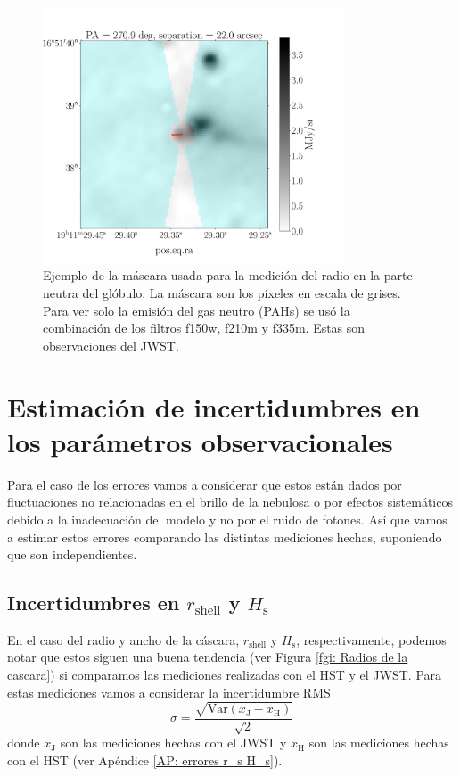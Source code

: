 \documentclass{book}
\begin{document}
\begin{figure}[htb]
    \centering
    \includegraphics[width=0.8\textwidth]{Nuevas imagenes finales/r_0_.pdf}
    \caption{Ejemplo de la máscara usada para la medición del radio en la parte neutra del glóbulo. La máscara son los píxeles en escala de grises. Para ver solo la emisión del gas neutro (PAHs) se usó la combinación de los filtros f150w, f210m y f335m. Estas son observaciones del JWST.}
    \label{Medicion de r_0}
\end{figure}

\section[Errores observacionales]{Estimación de incertidumbres en los parámetros observacionales}

Para el caso de los errores vamos a considerar que estos están dados por fluctuaciones no relacionadas en el brillo de la nebulosa o por efectos  sistemáticos debido a la inadecuación del modelo y no por el ruido de fotones. Así que vamos a estimar estos errores comparando las distintas mediciones hechas, suponiendo que son independientes.

\subsection{\boldmath Incertidumbres en $r_\mathrm{shell}$ y $H_\mathrm{s}$}
\label{sec:error-shell}
En el caso del radio y ancho de la cáscara, $r_\mathrm{shell}$ y $H_\mathrm{s}$, respectivamente, podemos notar que estos siguen una buena tendencia (ver Figura \ref{fgi: Radios de la cascara}) si comparamos las mediciones realizadas con el HST y el JWST. Para estas mediciones vamos a considerar la incertidumbre RMS
\begin{equation}
    \sigma=\frac{\sqrt{\mathrm{Var}(x_\mathrm{J}-x_\mathrm{H})}}{\sqrt{2}}
\end{equation}
donde $x_\mathrm{J}$ son las mediciones hechas con el JWST y $x_\mathrm{H}$ son las mediciones hechas con el HST (ver Apéndice \ref{AP: errores r_s H_s}).
\end{document}
